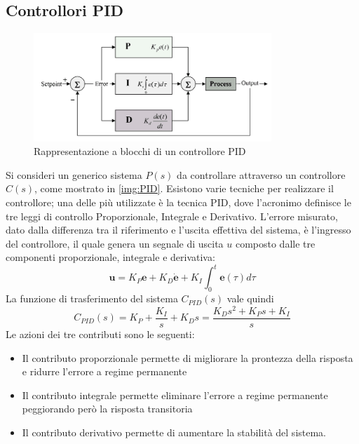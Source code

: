 \subsection{Controllori PID}
    \begin{figure}[h]
      \centering
      \includegraphics[width=0.8\textwidth]{img/PID.png}
      \caption{Rappresentazione a blocchi di un controllore PID}
      \label{img:PID}
    \end{figure}
  Si consideri un generico sistema $P(s)$ da controllare attraverso un controllore $C(s)$, come mostrato in \autoref{img:PID}. Esistono varie tecniche per realizzare il controllore; una delle più utilizzate è la tecnica PID, dove l'acronimo definisce le tre leggi di controllo Proporzionale, Integrale e Derivativo. L'errore misurato, dato dalla differenza tra il riferimento e l'uscita effettiva 
    del sistema, è l'ingresso del controllore, il quale genera un segnale di uscita $u$ composto dalle tre componenti 
    proporzionale, integrale e derivativa:
    \begin{displaymath}
      \boldsymbol{u} = K_P  \boldsymbol{e}  + K_D  \dot{ \boldsymbol{e}} + K_I \int_{0}^t  \boldsymbol{e}(\tau) d\tau 
    \end{displaymath}
  La funzione di trasferimento del sistema $C_{PID}(s)$ vale quindi 
  \begin{displaymath}
    C_{PID}(s)=K_P + \frac{K_I}{s}+ K_Ds = \frac{K_Ds^2 + K_Ps + K_I}{s}
  \end{displaymath}
  Le azioni dei tre contributi sono le seguenti:
  \begin{itemize}
    \item Il contributo proporzionale permette di migliorare la prontezza della risposta e ridurre l'errore a regime permanente
    \item Il contributo integrale permette eliminare l'errore a regime permanente peggiorando però la risposta transitoria
    \item Il contributo derivativo permette di aumentare la stabilità del sistema.
  \end{itemize}

